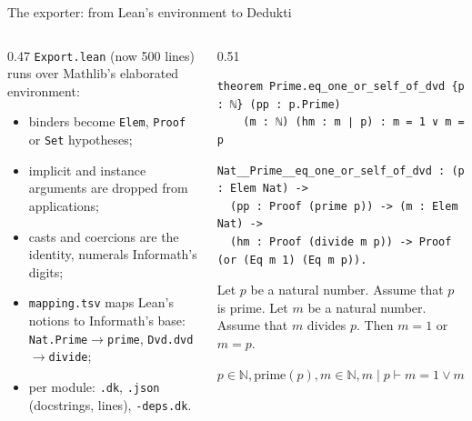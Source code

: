 \documentclass[10pt,aspectratio=169]{beamer}
\begin{document}
\begin{frame}[fragile]{The exporter: from Lean's environment to Dedukti}
  \begin{columns}[T]
    \begin{column}{0.47\textwidth}
      \texttt{Export.lean} (now 500 lines) runs over Mathlib's elaborated
      environment:
      \begin{itemize}
        \item binders become \texttt{Elem}, \texttt{Proof} or \texttt{Set}
              hypotheses;
        \item implicit and instance arguments are dropped from applications;
        \item casts and coercions are the identity, numerals Informath's digits;
        \item \texttt{mapping.tsv} maps Lean's notions to Informath's base:
              \texttt{Nat.Prime}$\to$\texttt{prime}, \texttt{Dvd.dvd}$\to$\texttt{divide};
        \item per module: \texttt{.dk}, \texttt{.json} (docstrings, lines),
              \texttt{-deps.dk}.
      \end{itemize}
    \end{column}
    \begin{column}{0.51\textwidth}
\begin{lstlisting}
theorem Prime.eq_one_or_self_of_dvd {p : ℕ} (pp : p.Prime)
    (m : ℕ) (hm : m ∣ p) : m = 1 ∨ m = p
\end{lstlisting}
\begin{lstlisting}
Nat__Prime__eq_one_or_self_of_dvd : (p : Elem Nat) ->
  (pp : Proof (prime p)) -> (m : Elem Nat) ->
  (hm : Proof (divide m p)) -> Proof (or (Eq m 1) (Eq m p)).
\end{lstlisting}
      \small
      Let $p$ be a natural number. Assume that $p$ is prime. Let $m$ be a
      natural number. Assume that $m$ divides $p$. Then $m = 1$ or $m = p$.

      \vspace{1mm}
      $p \in \mathbb{N}, \mathrm{prime}(p), m \in \mathbb{N}, m \mid p
      \vdash m = 1 \vee m = p$
    \end{column}
  \end{columns}
\end{frame}
\end{document}
